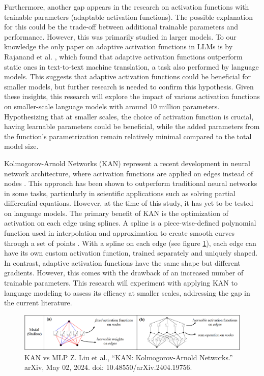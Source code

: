 Furthermore, another gap appears in the research on activation functions with trainable parameters (adaptable activation functions). The possible explanation for this could be the trade-off between additional trainable parameters and performance. However, this was primarily studied in larger models. To our knowledge the only paper on adaptive activation functions in LLMs is by Rajanand et al. \cite{Rajanand}, which found that adaptive activation functions outperform static ones in text-to-text machine translation, a task also performed by language models. This suggests that adaptive activation functions could be beneficial for smaller models, but further research is needed to confirm this hypothesis. Given these insights, this research will explore the impact of various activation functions on smaller-scale language models with around 10 million parameters. Hypothesizing that at smaller scales, the choice of activation function is crucial, having learnable parameters could be beneficial, while the added parameters from the function's parametrization remain relatively minimal compared to the total model size.

Kolmogorov-Arnold Networks (KAN) represent a recent development in neural network architecture, where activation functions are applied on edges instead of nodes \cite{Liu2024}. This approach has been shown to outperform traditional neural networks in some tasks, particularly in scientific applications such as solving partial differential equations. However, at the time of this study, it has yet to be tested on language models. The primary benefit of KAN is the optimization of activation on each edge using splines. A spline is a piece-wise-defined polynomial function used in interpolation and approximation to create smooth curves through a set of points \cite{chaudhuri_b-splines_2021}. With a spline on each edge (see figure \ref{fig:kan}), each edge can have its own custom activation function, trained separately and uniquely shaped. In contrast, adaptive activation functions have the same shape but different gradients. However, this comes with the drawback of an increased number of trainable parameters. This research will experiment with applying KAN to language modeling to assess its efficacy at smaller scales, addressing the gap in the current literature.


\begin{figure}[ht]
    \centering
    \includegraphics[width=\columnwidth * 2]{figures/kan-network.png}
    \caption{KAN vs MLP Z. Liu et al., “KAN: Kolmogorov-Arnold Networks.” arXiv, May 02, 2024. doi: 10.48550/arXiv.2404.19756.}
    \label{fig:kan}
\end{figure}